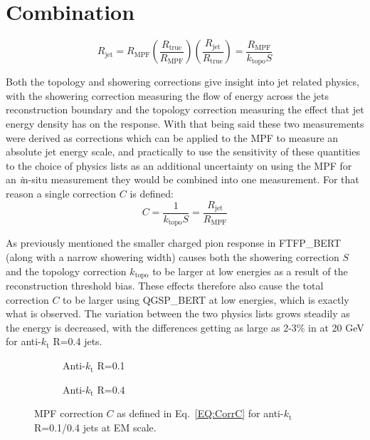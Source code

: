\section{Combination}

\begin{equation}
  R_{\mathrm{jet}} = R_{\mathrm{MPF}}\left(\frac{R_{\mathrm{true}}}{R_{\mathrm{MPF}}}\right)\left(\frac{R_{\mathrm{jet}}}{R_{\mathrm{true}}}\right) = \frac{R_{\mathrm{MPF}}}{k_{\mathrm{topo}}S}
\end{equation}

Both the topology and showering corrections give insight into jet related physics, with the showering correction measuring the flow of energy across the jets reconstruction boundary and the topology correction measuring the effect that jet energy density has on the response.  
With that being said these two measurements were derived as corrections which can be applied to the MPF to measure an absolute jet energy scale, and practically to use the sensitivity of these quantities to the choice of physics lists as an additional uncertainty on using the MPF for an {\textit in-situ} measurement they would be combined into one measurement.  
For that reason a single correction $C$ is defined:
\begin{equation}
  C = \frac{1}{k_{\mathrm{topo}}S} = \frac{R_{\mathrm{jet}}}{R_{\mathrm{MPF}}}
  \label{EQ:CorrC}
\end{equation}

As previously mentioned the smaller charged pion response in FTFP\_BERT (along with a narrow showering width) causes both the showering correction $S$ and the topology correction $k_{\mathrm{topo}}$ to be larger at low energies as a result of the reconstruction threshold bias.  
These effects therefore also cause the total correction $C$ to be larger using QGSP\_BERT at low energies, which is exactly what is observed.  
The variation between the two physics lists grows steadily as the energy is decreased, with the differences getting as large as 2-3\% in at 20 GeV for anti-$k_\mathrm{t}$ R=0.4 jets.  


\begin{figure}[!ht]
  \centering
  \begin{subfigure}{.5\textwidth}
    \centering
    \caption{Anti-$k_\mathrm{t}$ R=0.1}
  \end{subfigure}%
  \begin{subfigure}{.5\textwidth}  \centering
    \caption{Anti-$k_\mathrm{t}$ R=0.4}
  \end{subfigure}
  \caption[MPF Correction $C$ for anti-$k_\mathrm{t}$ R=0.1/0.4 jets]
{\small MPF correction $C$ as defined in Eq.~\ref{EQ:CorrC} for anti-$k_\mathrm{t}$ R=0.1/0.4 jets at EM scale.  }
  \label{Fig:TopoCorr_1-4}
\end{figure}

